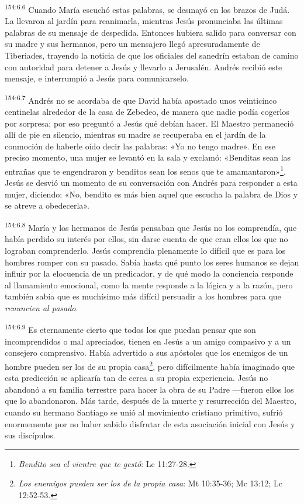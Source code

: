 \par 
\textsuperscript{154:6.6} Cuando María escuchó estas palabras, se desmayó en los brazos de Judá. La llevaron al jardín para reanimarla, mientras Jesús pronunciaba las últimas palabras de su mensaje de despedida. Entonces hubiera salido para conversar con su madre y sus hermanos, pero un mensajero llegó apresuradamente de Tiberiades, trayendo la noticia de que los oficiales del sanedrín estaban de camino con autoridad para detener a Jesús y llevarlo a Jerusalén. Andrés recibió este mensaje, e interrumpió a Jesús para comunicarselo.

\par 
\textsuperscript{154:6.7} Andrés no se acordaba de que David había apostado unos veinticinco centinelas alrededor de la casa de Zebedeo, de manera que nadie podía cogerlos por sorpresa; por eso preguntó a Jesús qué debían hacer. El Maestro permaneció allí de pie en silencio, mientras su madre se recuperaba en el jardín de la conmoción de haberle oído decir las palabras: «Yo no tengo madre». En ese preciso momento, una mujer se levantó en la sala y exclamó: «Benditas sean las entrañas que te engendraron y benditos sean los senos que te amamantaron»\footnote{\textit{Bendito sea el vientre que te gestó}: Lc 11:27-28.}. Jesús se desvió un momento de su conversación con Andrés para responder a esta mujer, diciendo: «No, bendito es más bien aquel que escucha la palabra de Dios y se atreve a obedecerla».

\par 
\textsuperscript{154:6.8} María y los hermanos de Jesús pensaban que Jesús no los comprendía, que había perdido su interés por ellos, sin darse cuenta de que eran ellos los que no lograban comprenderlo. Jesús comprendía plenamente lo difícil que es para los hombres romper con su pasado. Sabía hasta qué punto los seres humanos se dejan influir por la elocuencia de un predicador, y de qué modo la conciencia responde al llamamiento emocional, como la mente responde a la lógica y a la razón, pero también sabía que es muchísimo más difícil persuadir a los hombres para que \textit{renuncien al pasado}.

\par 
\textsuperscript{154:6.9} Es eternamente cierto que todos los que puedan pensar que son incomprendidos o mal apreciados, tienen en Jesús a un amigo compasivo y a un consejero comprensivo. Había advertido a sus apóstoles que los enemigos de un hombre pueden ser los de su propia casa\footnote{\textit{Los enemigos pueden ser los de la propia casa}: Mt 10:35-36; Mc 13:12; Lc 12:52-53.}, pero difícilmente había imaginado que esta predicción se aplicaría tan de cerca a su propia experiencia. Jesús no abandonó a su familia terrestre para hacer la obra de su Padre ---fueron ellos los que lo abandonaron. Más tarde, después de la muerte y resurrección del Maestro, cuando su hermano Santiago se unió al movimiento cristiano primitivo, sufrió enormemente por no haber sabido disfrutar de esta asociación inicial con Jesús y sus discípulos.


